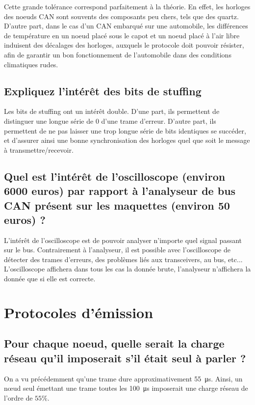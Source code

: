 \documentclass[12pt]{article}
\begin{document}
Cette grande tolérance correspond parfaitement à la théorie. En effet, les horloges des noeuds CAN sont souvents des composants peu chers, tels que des quartz. D'autre part, dans le cas d'un CAN embarqué sur une automobile, les différences de température en un noeud placé sous le capot et un noeud placé à l'air libre induisent des décalages des horloges, auxquels le protocole doit pouvoir résister, afin de garantir un bon fonctionnement de l'automobile dans des conditions climatiques rudes.

\subsection{Expliquez l'intérêt des bits de stuffing}

Les bits de stuffing ont un intérêt double. D'une part, ils permettent de distinguer une longue série de 0 d'une trame d'erreur. D'autre part, ils permettent de ne pas laisser une trop longue série de bits identiques se succéder, et d'assurer ainsi une bonne synchronisation des horloges quel que soit le message à transmettre/recevoir.

\subsection{Quel est l'intérêt de l'oscilloscope (environ 6000 euros) par rapport à l'analyseur de bus CAN présent sur les maquettes (environ 50 euros) ?}

L'intérêt de l'oscilloscope est de pouvoir analyser n'importe quel signal passant sur le bus. Contrairement à l'analyseur, il est possible avec l'oscilloscope de détecter des trames d'erreurs, des problèmes liés aux transceivers, au bus, etc... L'oscilloscope affichera dans tous les cas la donnée brute, l'analyseur n'affichera la donnée que si elle est correcte.

\section{Protocoles d'émission}

\subsection{Pour chaque noeud, quelle serait la charge réseau qu'il imposerait s'il était seul à parler ?}

On a vu précédemment qu'une trame dure approximativement \SI{55}{\micro\second}. Ainsi, un nœud seul émettant une trame toutes les \SI{100}{\micro\second} imposerait une charge réseau de l'ordre de $55\%$.
\end{document}

